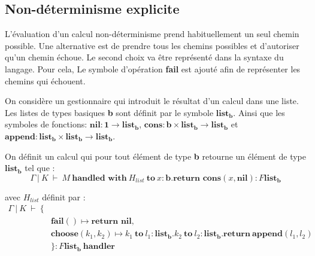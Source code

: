 
\subsection{Non-déterminisme explicite}

	L'évaluation d'un calcul non-déterminisme prend habituellement un seul chemin possible. Une alternative est de prendre tous les chemins possibles et d'autoriser qu'un chemin échoue. Le second choix va être représenté dans la syntaxe du langage.
	Pour cela, Le symbole d'opération \textbf{fail} est ajouté afin de représenter les chemins qui échouent.
	
	On considère un gestionnaire qui introduit le résultat d'un calcul dans une liste. Les listes de types basiques \textbf{b} sont définit par le symbole $\textbf{list}_\textbf{b}$. Ainsi que les symboles de fonctions: 
	$\textbf{nil} : \textbf{1} \rightarrow \textbf{list}_\textbf{b}$, 
	$\textbf{cons}: \textbf{b} \times \textbf{list}_\textbf{b} \rightarrow \textbf{list}_\textbf{b}$ et $\textbf{append} : \textbf{list}_\textbf{b} \times \textbf{list}_\textbf{b} \rightarrow \textbf{list}_\textbf{b}$.
	\smallbreak
	
	On définit un calcul qui pour tout élément de type \textbf{b} retourne un élément de type $\textbf{list}_\textbf{b}$ tel que : 
	\[\Gamma~|~K~\vdash~M~\textbf{handled~with}~H_{list}~\textbf{to}~x:\textbf{b}.\textbf{return~cons}(x,\textbf{nil}):F\textbf{list}_\textbf{b}\]

	avec $H_{list}$ définit par :
	\begin{align*}
		\Gamma~|~K~\vdash~\{& \\
		 &\textbf{fail}() \mapsto \textbf{return~nil},\\
		 &\textbf{choose}(k_1,k_2) \mapsto k_1~\textbf{to}~l_1:\textbf{list}_\textbf{b}.k_2~\textbf{to}~l_2:\textbf{list}_\textbf{b}.\textbf{return}~\textbf{append}(l_1,l_2) \\
		 &\}:F\textbf{list}_\textbf{b}~\textbf{handler}
	\end{align*}

